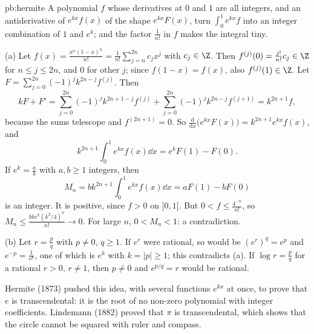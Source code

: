 \begin{solution}{pb:hermite}
\idea A polynomial $f$ whose derivatives at $0$ and $1$ are all integers, and an antiderivative of $e^{kx}f(x)$ of the shape $e^{kx}F(x)$,
turn $\int_0^1e^{kx}f$ into an integer combination of $1$ and $e^k$; and the factor $\frac1{n!}$ in $f$ makes the integral tiny.

\writeup (a) Let $f(x)=\frac{x^n(1-x)^n}{n!}=\frac1{n!}\sum_{j=n}^{2n}c_jx^j$ with $c_j\in\Z$. Then $f^{(j)}(0)=\frac{j!}{n!}c_j\in\Z$ for $n\le j\le2n$, and $0$ for
other $j$; since $f(1-x)=f(x)$, also $f^{(j)}(1)\in\Z$. Let $F=\sum_{j=0}^{2n}(-1)^jk^{2n-j}f^{(j)}$. Then
\[
kF+F'=\sum_{j=0}^{2n}(-1)^jk^{2n+1-j}f^{(j)}+\sum_{j=0}^{2n}(-1)^jk^{2n-j}f^{(j+1)}=k^{2n+1}f,
\]
because the sums telescope and $f^{(2n+1)}=0$. So $\frac{\mathrm d}{\mathrm dx}\bigl(e^{kx}F(x)\bigr)=k^{2n+1}e^{kx}f(x)$, and
\[
k^{2n+1}\int_0^1e^{kx}f(x)\dd x=e^kF(1)-F(0).
\]
If $e^k=\frac ab$ with $a,b\ge1$ integers, then
\[
M_n=bk^{2n+1}\int_0^1e^{kx}f(x)\dd x=aF(1)-bF(0)
\]
is an integer. It is positive, since
$f>0$ on $]0,1[$. But $0<f\le\frac{4^{-n}}{n!}$, so $M_n\le\frac{bk e^k(k^2/4)^n}{n!}\to0$. For large $n$, $0<M_n<1$: a contradiction.

(b) Let $r=\frac pq$ with $p\ne0$, $q\ge1$. If $e^r$ were rational, so would be $(e^r)^q=e^p$ and $e^{-p}=\frac1{e^p}$, one of which is $e^k$
with $k=|p|\ge1$; this contradicts (a). If $\log r=\frac pq$ for a rational $r>0$, $r\ne1$, then $p\ne0$ and $e^{p/q}=r$ would be
rational.

\leads Hermite (1873) pushed this idea, with several functions $e^{kx}$ at once, to prove that $e$ is transcendental: it is the root of
no non-zero polynomial with integer coefficients. Lindemann (1882) proved that $\pi$ is transcendental, which shows that the circle
cannot be squared with ruler and compass.
\end{solution}

